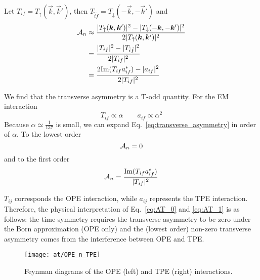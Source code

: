 Let $T_{if} = T_{\uparrow}(\vec{k}, \vec{k}')$, then $T_{\tilde{i}\tilde{f}} = T_\downarrow (-\vec{k}, -\vec{k}')$
and
\begin{equation}
    \begin{aligned}
	\mathcal{A}_n &\approx \frac{|T_{\uparrow}(\boldsymbol{k}, \boldsymbol{k}')|^2 - |T_{\downarrow}(-\boldsymbol{k}, -\boldsymbol{k}')|^2}{2|T_{\uparrow}(\boldsymbol{k}, \boldsymbol{k}')|^2} \\
	    &= \frac{|T_{if}|^2 - |T_{\tilde{i}\tilde{f}}|^2}{2|T_{if}|^2}  \\
	    &= \frac{2\text{Im}(T_{if}a^*_{if}) - |a_{if}|^2}{2|T_{if}|^2}
    \end{aligned}
    \label{eq:transverse_asymmetry}
\end{equation}

We find that the transverse asymmetry is a T-odd quantity. For the EM interaction
\begin{equation}
    T_{if} \propto \alpha \qquad a_{if} \propto \alpha^2
\end{equation}
Because $\alpha \simeq \frac{1}{137}$ is small, we can expand Eq.~\ref{eq:transverse_asymmetry} 
in order of $\alpha$. To the lowest order
\begin{equation}
    \mathcal{A}_n = 0
    \label{eq:AT_0}
\end{equation}
and to the first order 
\begin{equation}
    \mathcal{A}_n = \frac{\text{Im}(T_{if}a^*_{if})}{|T_{if}|^2}
    \label{eq:AT_1}
\end{equation}

$T_{ij}$ corresponds the OPE interaction, while $a_{ij}$ represents
the TPE interaction. Therefore, the physical interpretation of
Eq.~\ref{eq:AT_0} and \ref{eq:AT_1} is as follows: the time symmetry requires 
the transverse asymmetry to be zero under the Born approximation (OPE only)
and the (lowest order) non-zero transverse asymmetry comes from the interference 
between OPE and TPE.
\begin{figure}[!h]
    \centering
    \texttt{[image: at/OPE\_n\_TPE]}
    \caption{Feynman diagrams of the OPE (left) and TPE (right) interactions.}
\end{figure}

